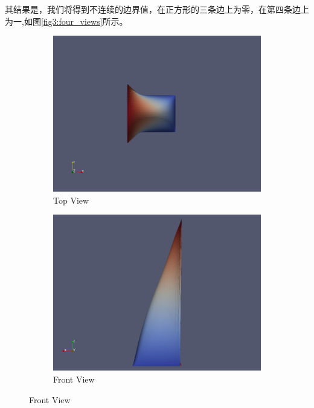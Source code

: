 \documentclass[12pt, a4paper]{article}
\numberwithin{equation}{section} %
\begin{document}
其结果是，我们将得到不连续的边界值，在正方形的三条边上为零，在第四条边上为一,如图\ref{fig3:four_views}所示。
\begin{figure}[htbp]
    \centering
    \begin{subfigure}{0.48\textwidth}
        \centering
        \includegraphics[width=\textwidth]{proj9.png}
        \caption{Top View}
        \label{fig3:front_view}
    \end{subfigure}
    \hfill
    \begin{subfigure}{0.48\textwidth}
        \centering
        \includegraphics[width=\textwidth]{proj10.png}
        \caption{Front View}
        \label{fig3:top_view}
    \end{subfigure}
    

\end{figure}
\end{document}
